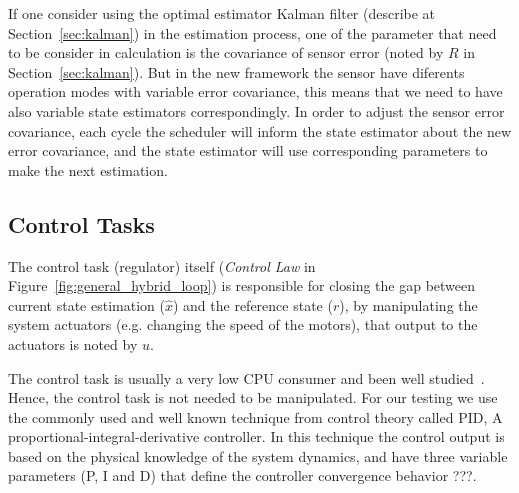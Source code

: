 \documentclass[ twoside, 12pt ]{article}
\newcommand{\commentOut}[1]{}
\begin{document}
{If one consider using the optimal estimator Kalman filter (describe at Section~\ref{sec:kalman}) in the estimation process, one of the parameter that need to be consider in calculation is the covariance of sensor error (noted by $R$ in Section~\ref{sec:kalman}).
But in the new framework the sensor have diferents operation modes with variable error covariance, this means that we need to have also variable state estimators correspondingly.
In order to adjust the sensor error covariance, each cycle the scheduler will inform the state estimator about the new error covariance, and the state estimator will use corresponding parameters to make the next estimation.

\subsection{Control Tasks} 
\label{sec:control} 
The control task (regulator) itself (\textit{Control Law} in Figure~\ref{fig:general_hybrid_loop}) is responsible for closing the gap between current state estimation ($\hat{x}$) and the reference state ($r$), by manipulating the system actuators (e.g. changing the speed of the motors), that output to the actuators is noted by $u$.

The control task is usually a very low CPU consumer and been well studied~\cite{Bennett,Cervin}. Hence, the control task is not needed to be manipulated.
For our testing we use the commonly used and well known technique from control theory called PID, A proportional-integral-derivative controller.
In this technique the control output is based on the physical knowledge of the system dynamics, and have three variable parameters (P, I and D) that define the controller convergence behavior \cite{PID} ???.

\commentOut{
    We also plan to try to use an ``adjustable'' LQR (Linear-quadratic regulator) control, as follows.
    LQR is an optimal controller that take into account the level of certainty of the state estimation. 
    Is usually a hard task to know the certainty of estimation, but in our case we need to calculate it anyway, and we mark it as $var(x-\tilde{x})$.
    We will make LQR ``adjustable'' in the sense that each iteration the controller will consider the new (variable) $var(x-\tilde{x})$. This is similar to the architecture we proposed for the estimator.
    We will check if adjustable LQR has significant advantages over PID in cases were we have variable certainty of estimation.
}

}
\end{document}
